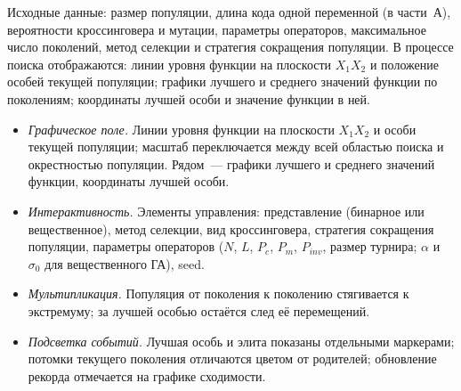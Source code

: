 Исходные данные: размер популяции, длина кода одной переменной (в части~А), вероятности кроссинговера
и мутации, параметры операторов, максимальное число поколений, метод селекции и стратегия сокращения
популяции. В процессе поиска отображаются: линии уровня функции на плоскости $X_1X_2$ и положение особей
текущей популяции; графики лучшего и среднего значений функции по поколениям; координаты лучшей особи и
значение функции в ней.

\begin{itemize}
\item \emph{Графическое поле.} Линии уровня функции на плоскости $X_1X_2$ и особи текущей популяции; масштаб переключается между всей областью поиска и окрестностью популяции. Рядом~--- графики лучшего и среднего значений функции, координаты лучшей особи.
\item \emph{Интерактивность.} Элементы управления: представление (бинарное или вещественное), метод селекции, вид кроссинговера, стратегия сокращения популяции, параметры операторов ($N$, $L$, $P_c$, $P_m$, $P_{inv}$, размер турнира; $\alpha$ и $\sigma_0$ для вещественного ГА), seed.
\item \emph{Мультипликация.} Популяция от поколения к поколению стягивается к экстремуму; за лучшей особью остаётся след её перемещений.
\item \emph{Подсветка событий.} Лучшая особь и элита показаны отдельными маркерами; потомки текущего поколения отличаются цветом от родителей; обновление рекорда отмечается на графике сходимости.
\end{itemize}

